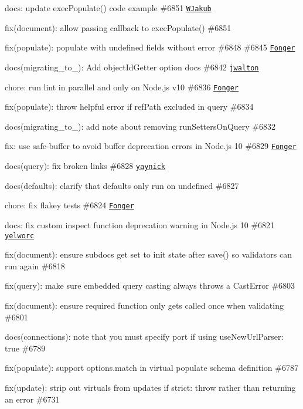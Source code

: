 \begin{DoxyItemize}
\item docs\+: update {\ttfamily exec\+Populate()} code example \#6851 \href{https://github.com/WJakub}{\tt W\+Jakub}
\item fix(document)\+: allow passing callback to {\ttfamily exec\+Populate()} \#6851
\item fix(populate)\+: populate with undefined fields without error \#6848 \#6845 \href{https://github.com/Fonger}{\tt Fonger}
\item docs(migrating\+\_\+to\+\_)\+: Add {\ttfamily object\+Id\+Getter} option docs \#6842 \href{https://github.com/jwalton}{\tt jwalton}
\item chore\+: run lint in parallel and only on Node.\+js v10 \#6836 \href{https://github.com/Fonger}{\tt Fonger}
\item fix(populate)\+: throw helpful error if ref\+Path excluded in query \#6834
\item docs(migrating\+\_\+to\+\_)\+: add note about removing run\+Setters\+On\+Query \#6832
\item fix\+: use safe-\/buffer to avoid buffer deprecation errors in Node.\+js 10 \#6829 \href{https://github.com/Fonger}{\tt Fonger}
\item docs(query)\+: fix broken links \#6828 \href{https://github.com/yaynick}{\tt yaynick}
\item docs(defaults)\+: clarify that defaults only run on undefined \#6827
\item chore\+: fix flakey tests \#6824 \href{https://github.com/Fonger}{\tt Fonger}
\item docs\+: fix custom inspect function deprecation warning in Node.\+js 10 \#6821 \href{https://github.com/yelworc}{\tt yelworc}
\item fix(document)\+: ensure subdocs get set to init state after save() so validators can run again \#6818
\item fix(query)\+: make sure embedded query casting always throws a Cast\+Error \#6803
\item fix(document)\+: ensure {\ttfamily required} function only gets called once when validating \#6801
\item docs(connections)\+: note that you must specify port if using {\ttfamily use\+New\+Url\+Parser\+: true} \#6789
\item fix(populate)\+: support {\ttfamily options.\+match} in virtual populate schema definition \#6787
\item fix(update)\+: strip out virtuals from updates if strict\+: \textquotesingle{}throw\textquotesingle{} rather than returning an error \#6731
\end{DoxyItemize}

